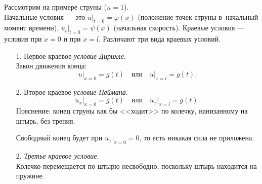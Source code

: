 \documentclass[12pt,a5paper]{book}
\begin{document}
	\noindent Рассмотрим на примере струны ($n = 1$).\\ Начальные условия --- это $u|_{t=0} = \varphi(x)$ (положение точек струны в~начальный момент времени), $u_t|_{t=0} = \psi(x)$ (начальная скорость). Краевые условия --- условия при $x = 0$ и при $x = l$. Различают три вида краевых условий.
	\begin{itemize}
		\item [1.] Первое краевое \emph{условие Дирихле}.\\
		Закон движения конца:
		\begin{equation*}
			\left.u\right|_{x=0} = g(t) \quad \text{или} \quad \left.u\right|_{x=l} = g(t).
		\end{equation*}
		\item [2.] Второе краевое \emph{условие Неймана}.\\
		\begin{equation*}
			\left.u_x\right|_{x=0} = g(t) \quad \text{или} \quad \left.u_x\right|_{x=l} = g(t).
		\end{equation*}
		Пояснение: конец струны как бы <<ходит>> по колечку, нанизанному на штырь, без трения.
		\begin{center}
		\end{center}
		Свободный конец будет при $u_x|_{x=0} = 0$, то есть никакая сила не приложена.
		\item [2.] \emph{Третье краевое условие}.\\
		Колечко перемещается по штырю несвободно, поскольку штырь находится на пружине.
		\begin{center}
\end{center}
\end{itemize}
\end{document}
